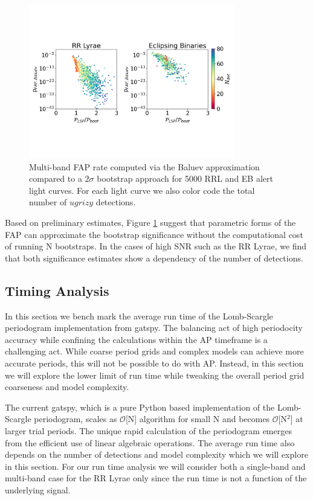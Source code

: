 \documentclass[DM,authoryear,toc]{lsstdoc}
\begin{document}
\begin{figure}
  \includegraphics[width=0.8\textwidth]{figures/fap_approximation_mlsp.pdf}
  \centering 
  \caption{Multi-band FAP rate computed via the Baluev approximation compared to a $2\sigma$ bootstrap approach for 5000 RRL and EB alert light curves.
For each light curve we also color code the total number of $ugrizy$ detections.}
  \label{fig:boot}
\end{figure}

Based on preliminary estimates, Figure \ref{fig:boot} suggest that parametric forms of the FAP can approximate the bootstrap significance without the computational cost of running N bootstraps.
In the cases of high SNR such as the RR Lyrae, we find that both significance estimates show a dependency of the number of detections.


\subsection{Timing Analysis}

In this section we bench mark the average run time of the Lomb-Scargle periodogram implementation from gatspy.
The balancing act of high periodocity accuracy while confining the calculations within the AP timeframe is a challenging act.
While coarse period grids  and complex models can achieve more accurate periods, this will not be possible to do with AP.
Instead, in this section we will explore the lower limit of run time while tweaking the overall period grid coarseness and model complexity.

The current gatspy, which is a pure Python based implementation of the Lomb-Scargle periodogram, scales as  $\mathcal{O}$[N] algorithm for small N and becomes $\mathcal{O}$[N$^2$] at larger trial periods.
The unique rapid calculation of the periodogram emerges from the efficient use of linear algebraic operations.
The average run time also depends on the number of detections and model complexity which we will explore in this section.
For our run time analysis we will consider both a single-band and multi-band case for the RR Lyrae only since the run time is not a function of the underlying signal.
\end{document}
